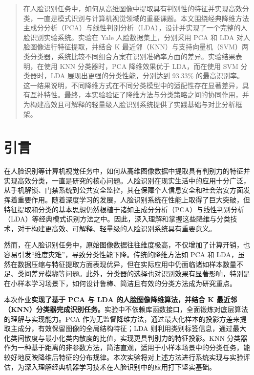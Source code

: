 \documentclass[a4paper, utf8]{ctexart}
\begin{document}
	\maketitle
	
	\renewcommand{\abstractname}{\large \textbf{摘要}}
	\begin{abstract}
		在人脸识别任务中，如何从高维图像中提取具有判别性的特征并实现高效分类，一直是模式识别与计算机视觉领域的重要课题。本文围绕经典降维方法主成分分析（PCA）与线性判别分析（LDA），设计并实现了一个完整的人脸识别实验系统。实验在 Yale 人脸数据集上，分别采用 PCA 和 LDA 对人脸图像进行特征提取，并结合 K 最近邻（KNN）与支持向量机（SVM）两类分类器，系统比较不同组合方案在识别准确率方面的差异。实验结果表明，在使用 KNN 分类器时，PCA 降维效果优于 LDA，而在使用 SVM 分类器时，LDA 展现出更强的分类性能，分别达到 93.33\% 的最高识别率。这一结果说明，不同降维方式在不同分类模型中的适配性存在显著差异，具有互补特性。最终，本实验验证了降维方法与分类策略之间的协同作用，并为构建高效且可解释的轻量级人脸识别系统提供了实践基础与对比分析框架。
		
	\end{abstract}
	
	\section{引言}
	
	在人脸识别等计算机视觉任务中，如何从高维图像数据中提取具有判别力的特征并实现高效分类，一直是研究的核心问题。人脸识别在现实生活中的应用十分广泛，从手机解锁、门禁系统到公共安全监控，其在保障个人信息安全和社会治安方面发挥着重要作用。随着深度学习的发展，人脸识别系统在性能上取得了巨大突破，但特征提取和分类的基本思想仍然根植于诸如主成分分析（PCA）与线性判别分析（LDA）等经典模式识别方法之中。因此，深入理解和掌握这些降维与分类技术，对于构建更高效、可解释、轻量级的人脸识别系统具有重要意义。
	
	然而，在人脸识别任务中，原始图像数据往往维度极高，不仅增加了计算开销，也容易引发“维度灾难”，导致分类性能下降。传统的降维方法如 PCA 和 LDA，虽然在数据压缩与特征提取方面表现优异，但在实际应用中仍面临诸如样本数量不足、类间差异模糊等问题\cite{hfd,pcavslda}。此外，分类器的选择也对识别效果有显著影响，特别是在小样本学习场景下，如何设计鲁棒、简洁且有效的分类方法成为研究重点\cite{hfd}。
	
	本次作业\textbf{实现了基于 PCA 与 LDA 的人脸图像降维算法，并结合 K 最近邻（KNN）分类器完成识别任务。}实验中不依赖库函数接口，全面锻炼对底层算法的理解与实现能力。PCA 作为无监督降维方法，通过最大化样本的投影方差来提取主成分，有效保留图像的全局结构特征；LDA 则利用类别标签信息，通过最大化类间散度与最小化类内散度的比值，实现更具判别力的特征投影。KNN 分类器作为一种基于距离的非参数方法，简洁直观，适用于小样本场景中的分类任务，能较好地反映降维后特征的分布规律。本次实验将对上述方法进行系统实现与实验评估，为深入理解经典机器学习技术在人脸识别中的应用打下坚实基础。
	
\end{document}
